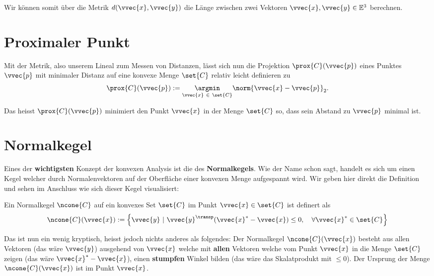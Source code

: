 \documentclass[
  12pt,
  british,
  a4paper,
  twoside,
  titlepage,
  openright,
  numbers=noenddot,
  chapterprefix=true,
  headings=optiontohead,
  svgnames,
  dvipsnames]{scrreprt}
\begin{document}
Wir können somit über die Metrik \(d(\vvec{x},\vvec{y})\) die Länge
zwischen zwei Vektoren \(\vvec{x},\vvec{y} \in \mathbb{E}^3\) berechnen.

\hypertarget{proximaler-punkt}{%
\section{Proximaler Punkt}\label{proximaler-punkt}}

Mit der Metrik, also unserem Lineal zum Messen von Distanzen, lässt sich
nun die Projektion \(\prox{C}(\vvec{p})\) eines Punktes \(\vvec{p}\) mit
minimaler Distanz auf eine konvexe Menge \(\set{C}\) relativ leicht
definieren zu
\begin{align} \prox{C}(\vvec{p}) :=  \underset{\vvec{x} \ \in \ \set{C}}{\argmin} \norm{\vvec{x} - \vvec{p}}_2. \end{align}

Das heisst \(\prox{C}(\vvec{p})\) minimiert den Punkt \(\vvec{x}\) in
der Menge \(\set{C}\) so, dass sein Abstand zu \(\vvec{p}\) minimal ist.

\hypertarget{normalkegel}{%
\section{Normalkegel}\label{normalkegel}}

Eines der \textbf{wichtigsten} Konzept der konvexen Analysis ist die des
\textbf{Normalkegels}. Wie der Name schon sagt, handelt es sich um einen
Kegel welcher durch Normalenvektoren auf der Oberfläche einer konvexen
Menge aufgespannt wird. Wir geben hier direkt die Definition und sehen
im Anschluss wie sich dieser Kegel visualisiert:

Ein Normalkegel \(\ncone{C}\) auf ein konvexes Set \(\set{C}\) im Punkt
\(\vvec{x} \in \set{C}\) ist definert als
\begin{align}     \ncone{C}(\vvec{x}) := \left\{ \vvec{y} \ | \ \vvec{y}^\transp(\vvec{x}^* - \vvec{x}) \leq 0, \quad \forall \vvec{x}^* \in \set{C} \right\} \end{align}

Das ist nun ein wenig kryptisch, heisst jedoch nichts anderes als
folgendes: Der Normalkegel \(\ncone{C}(\vvec{x})\) besteht aus allen
Vektoren (das wäre \(\vvec{y}\)) ausgehend von \(\vvec{x}\) welche mit
\textbf{allen} Vektoren welche vom Punkt \(\vvec{x}\) in die Menge
\(\set{C}\) zeigen (das wäre \(\vvec{x}^* - \vvec{x}\)), einen
\textbf{stumpfen} Winkel bilden (das wäre das Skalatprodukt mit
\(\leq 0\)). Der Ursprung der Menge \(\ncone{C}(\vvec{x})\) ist im Punkt
\(\vvec{x}\).
\end{document}
